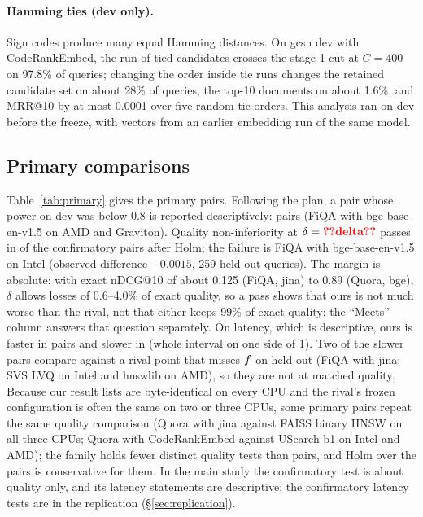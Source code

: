 \paragraph{Hamming ties (dev only).} Sign codes produce many equal Hamming distances. On gcsn dev with
CodeRankEmbed, the run of tied candidates crosses the stage-1 cut at $C = 400$ on 97.8\% of queries;
changing the order inside tie runs changes the retained candidate set on about 28\% of queries, the
top-10 documents on about 1.6\%, and MRR@10 by at most 0.0001 over five random tie orders. This analysis
ran on dev before the freeze, with vectors from an earlier embedding run of the same model.

\subsection{Primary comparisons}

Table~\ref{tab:primary} gives the  primary pairs. Following the plan, a pair whose power
on dev was below 0.8 is reported descriptively:  pairs (FiQA with bge-base-en-v1.5 on AMD and
Graviton). Quality non-inferiority at $\delta = \nm{delta}$ passes in  of the
 confirmatory pairs after Holm; the failure is FiQA with bge-base-en-v1.5 on Intel
(observed difference $-0.0015$, 259 held-out queries). The margin is absolute: with exact nDCG@10 of
about 0.125 (FiQA, jina) to 0.89 (Quora, bge), $\delta$ allows losses of 0.6--4.0\% of exact quality, so a
pass shows that ours is not much worse than the rival, not that either keeps 99\% of exact quality; the
``Meets'' column answers that question separately. On latency, which is descriptive, ours is faster in
 pairs and slower in  (whole interval on one side of 1). Two of the
slower pairs compare against a rival point that misses $f$ on held-out (FiQA with jina: SVS LVQ on
Intel and hnswlib on AMD), so they are not at matched quality. Because our result lists are byte-identical on every CPU and the
rival's frozen configuration is often the same on two or three CPUs, some primary pairs repeat the same
quality comparison (Quora with jina against FAISS binary HNSW on all three CPUs; Quora with CodeRankEmbed
against USearch b1 on Intel and AMD); the family holds fewer distinct quality tests than pairs, and Holm
over the pairs is conservative for them. In the main study the confirmatory test is about quality only, and its
latency statements are descriptive; the confirmatory latency tests are in the replication (\S\ref{sec:replication}).

